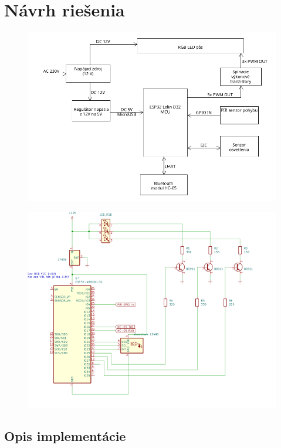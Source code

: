 \documentclass[12pt, a4paper]{article}
\begin{document}
\section{Návrh riešenia}
\begin{figure}
\includegraphics[width=\textwidth]{assets/block-diagram.png}
\end{figure}

\begin{figure}
\includegraphics[width=\textwidth]{assets/electrical-schematics.png}
\end{figure}

\subsection{Opis implementácie}
\end{document}
